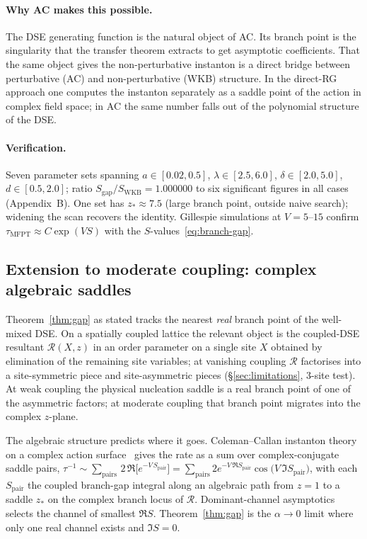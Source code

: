 \documentclass[11pt,a4paper]{article}
\theoremstyle{plain}
\begin{document}
\paragraph{Why AC makes this possible.}
The DSE generating function is the natural object of AC.  Its
branch point is the singularity that the transfer theorem
extracts to get asymptotic coefficients.  That the same object
gives the non-perturbative instanton is a direct bridge between
perturbative (AC) and non-perturbative (WKB) structure.  In the
direct-RG approach one computes the instanton separately as a
saddle point of the action in complex field space; in AC the
same number falls out of the polynomial structure of the DSE.

\paragraph{Verification.}
Seven parameter sets spanning $a \in [0.02, 0.5]$,
$\lambda \in [2.5, 6.0]$, $\delta \in [2.0, 5.0]$,
$d \in [0.5, 2.0]$; ratio $S_{\mathrm{gap}}/S_{\mathrm{WKB}} =
1.000000$ to six significant figures in all cases (Appendix~B).
One set has $z_* \approx 7.5$ (large branch point, outside naive
search); widening the scan recovers the identity.  Gillespie
simulations at $V = 5$--$15$ confirm
$\tau_{\mathrm{MFPT}} \approx C\exp(VS)$ with the
$S$-values~\eqref{eq:branch-gap}.

\subsection{Extension to moderate coupling: complex algebraic saddles}
\label{sec:branchgap-complex}

Theorem~\ref{thm:gap} as stated tracks the nearest \emph{real}
branch point of the well-mixed DSE.  On a spatially coupled
lattice the relevant object is the coupled-DSE resultant
$\mathcal{R}(X, z)$ in an order parameter on a single site $X$
obtained by elimination of the remaining site variables; at
vanishing coupling $\mathcal{R}$ factorises into a
site-symmetric piece and site-asymmetric pieces
(\S\ref{sec:limitations}, 3-site test).  At weak coupling the
physical nucleation saddle is a real branch point of one of the
asymmetric factors; at moderate coupling that branch point
migrates into the complex $z$-plane.

The algebraic structure predicts where it goes.  Coleman--Callan
instanton theory on a complex action surface~\citep{Coleman1977,CallanColeman1977}
gives the rate as a sum over complex-conjugate saddle pairs,
$\tau^{-1} \sim \sum_{\mathrm{pairs}}\,
2\,\Re\bigl[e^{-V\,S_{\mathrm{pair}}}\bigr]
= \sum_{\mathrm{pairs}} 2 e^{-V\,\Re S_{\mathrm{pair}}}
  \cos\!\bigl(V\,\Im S_{\mathrm{pair}}\bigr)$,
with each $S_{\mathrm{pair}}$ the coupled branch-gap integral
along an algebraic path from $z = 1$ to a saddle $z_*$ on the
complex branch locus of $\mathcal{R}$.  Dominant-channel
asymptotics selects the channel of smallest $\Re S$.  Theorem~\ref{thm:gap}
is the $\alpha \to 0$ limit where only one real channel exists
and $\Im S = 0$.
\end{document}

